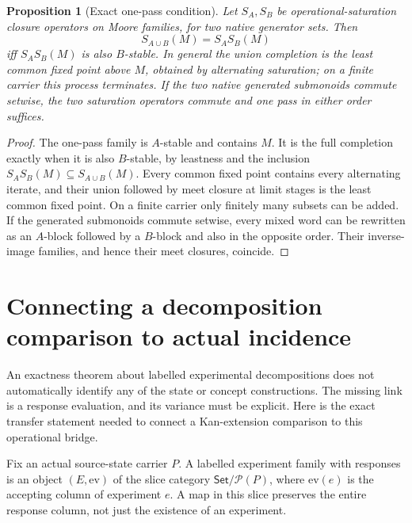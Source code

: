 \documentclass[11pt]{article}
\newtheorem{proposition}[theorem]{Proposition}
\theoremstyle{remark}\newtheorem{remark}[theorem]{Remark}
\newcommand{\Pow}{\mathcal P}
\begin{document}
\begin{proposition}[Exact one-pass condition]
Let $S_A,S_B$ be operational-saturation closure operators on Moore
families, for two native generator sets. Then
\[
 S_{A\cup B}(M)=S_A S_B(M)
\]
iff $S_A S_B(M)$ is also $B$-stable. In general the union completion
is the least common fixed point above $M$, obtained by alternating
saturation; on a finite carrier this process terminates. If the two
native generated submonoids commute setwise, the two saturation
operators commute and one pass in either order suffices.
\end{proposition}
\begin{proof}
The one-pass family is $A$-stable and contains $M$. It is the full
completion exactly when it is also $B$-stable, by leastness and the
inclusion $S_A S_B(M)\subseteq S_{A\cup B}(M)$.
Every common fixed point contains every alternating iterate, and their
union followed by meet closure at limit stages is the least common
fixed point. On a finite carrier only finitely many subsets can be
added. If the generated submonoids commute setwise, every mixed word
can be rewritten as an $A$-block followed by a $B$-block and also in the
opposite order. Their inverse-image families, and hence their meet
closures, coincide.
\end{proof}

\section{Connecting a decomposition comparison to actual incidence}
An exactness theorem about labelled experimental decompositions does
not automatically identify any of the state or concept constructions.
The missing link is a response evaluation, and its variance must be
explicit. Here is the exact transfer statement needed to connect a
Kan-extension comparison to this operational bridge.

Fix an actual source-state carrier $P$. A labelled experiment family
with responses is an object $(E,\mathrm{ev})$ of the slice category
$\mathsf{Set}/\Pow(P)$, where $\mathrm{ev}(e)$ is the accepting
column of experiment $e$. A map in this slice preserves the entire
response column, not just the existence of an experiment.
\end{document}
